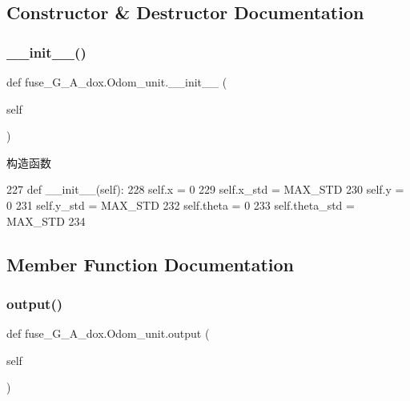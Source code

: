 \subsection{Constructor \& Destructor Documentation}
\mbox{\label{classfuse___g___a__dox_1_1_odom__unit_a8a0c348bf5b15910008f3d0677f6932b}} 
\subsubsection{\texorpdfstring{\+\_\+\+\_\+init\+\_\+\+\_\+()}{\_\_init\_\_()}}
{\footnotesize\ttfamily def fuse\+\_\+\+G\+\_\+\+A\+\_\+dox.\+Odom\+\_\+unit.\+\_\+\+\_\+init\+\_\+\+\_\+ (\begin{DoxyParamCaption}\item[{}]{self }\end{DoxyParamCaption})}



构造函数 


\begin{DoxyCode}
227     \textcolor{keyword}{def }\_\_init\_\_(self):
228         self.x = 0
229         self.x\_std = MAX\_STD
230         self.y = 0
231         self.y\_std = MAX\_STD
232         self.theta = 0
233         self.theta\_std = MAX\_STD
234 
\end{DoxyCode}


\subsection{Member Function Documentation}
\mbox{\label{classfuse___g___a__dox_1_1_odom__unit_af62561524085fe048e8991956e7ab573}} 
\subsubsection{\texorpdfstring{output()}{output()}}
{\footnotesize\ttfamily def fuse\+\_\+\+G\+\_\+\+A\+\_\+dox.\+Odom\+\_\+unit.\+output (\begin{DoxyParamCaption}\item[{}]{self }\end{DoxyParamCaption})}



